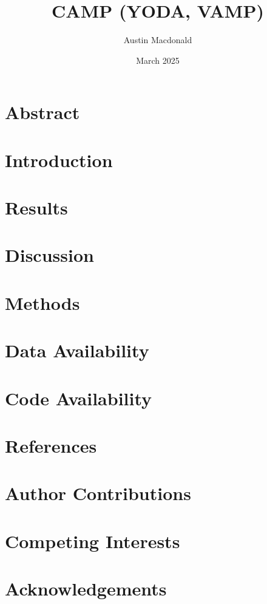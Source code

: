 \documentclass{article}
\title{CAMP (YODA, VAMP)}
\author{Austin Macdonald}
\date{March 2025}
\begin{document}
\maketitle

\section{Abstract}
\section{Introduction}
\section{Results}
\section{Discussion}
\section{Methods}
\section{Data Availability}
\section{Code Availability}
\section{References}
\section{Author Contributions}
\section{Competing Interests}
\section{Acknowledgements}
\end{document}
